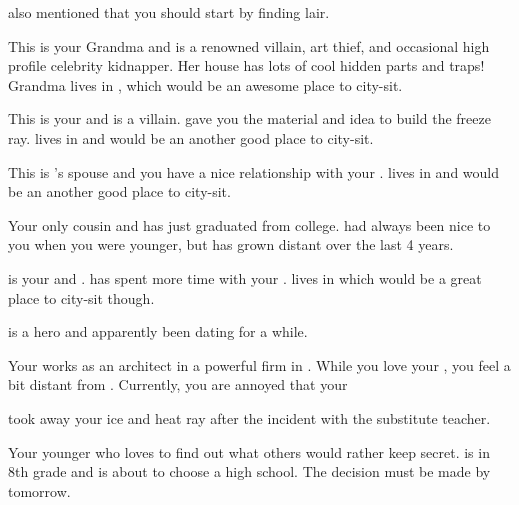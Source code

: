 \documentclass[char]{LRSguildcamp1}
\begin{document}
\begin{itemz}[Notes]
	\item \cGrandma{} also mentioned that you should start by finding \cGrandma{\their} lair.
\end{itemz}
\begin{contacts}
	\contact{\cGrandma{}} This is your Grandma and is a renowned villain, art thief, and occasional high profile celebrity kidnapper. Her house has lots of cool hidden parts and traps! Grandma lives in \pCityGrandma{}, which would be an awesome place to city-sit. 
	
	\contact{\cOldest{}} This is your  \cOldest{\uncle} and is a villain.  gave you the material and idea to build the freeze ray. \cOldest{} lives in \pCityO{} and would be an another good place to city-sit.
	
	\contact{\cOS{}} This is \cOldest{}'s spouse and you have a nice relationship with your \cOS{\them}.\cOS{} lives in \pCityO{} and would be an another good place to city-sit.
	
	\contact{\cGrad{}} Your only cousin  and has just graduated from college. \cGrad{} had always been nice to you when you were younger, but has grown distant over the last 4 years.  
	
	\contact{\cYoungest{}} \cYoungest{} is your \cYoungest{\uncle} and \cYoungest{\hero}. \cTween{} has spent more time with your \cYoungest{\uncle}. \cYoungest{} lives in \pCityYoungest{} which would be a great place to city-sit though.
 
	\contact{\cYS{}} \cYS{} is a hero and apparently been dating \cYoungest{} for a while. 
	
	\contact{\cArchitect{}} Your \cArchitect{\parent} works as an architect in a powerful firm in \pCityArchitect{}.  While you love your \cArchitect{\parent}, you feel a bit distant from \cArchitect{\them}. Currently, you are annoyed that your 
	
	\cArchitect{\parent} took away your ice and heat ray after the incident with the substitute teacher. 
	
	 	\contact{\cTween{}} Your younger \cTween{\sibling} who loves to find out what others would rather keep secret. \cTween{} is in 8th grade and is about to choose a high school. The decision must be made by tomorrow. 
		
\end{contacts}
\end{document}
